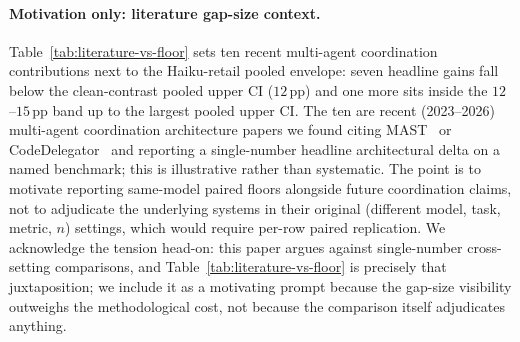 \paragraph{Motivation only: literature gap-size context.}
Table~\ref{tab:literature-vs-floor} sets ten recent multi-agent
coordination contributions next to the Haiku-retail pooled
envelope: seven headline gains fall below the clean-contrast
pooled upper CI ($12$\,pp) and one more sits inside the
$12$--$15$\,pp band up to the largest pooled upper CI. The ten are recent (2023--2026) multi-agent
coordination architecture papers we found citing
MAST~\cite{mast2025} or CodeDelegator~\cite{codedelegator2026}
and reporting a single-number headline architectural delta on a
named benchmark; this is illustrative rather than systematic.
The point is to motivate reporting same-model paired floors
alongside future coordination claims, not to adjudicate the
underlying systems in their original (different model, task,
metric, $n$) settings, which would require per-row paired
replication. We acknowledge the tension head-on: this paper
argues against single-number cross-setting comparisons, and
Table~\ref{tab:literature-vs-floor} is precisely that
juxtaposition; we include it as a motivating prompt because
the gap-size visibility outweighs the methodological cost,
not because the comparison itself adjudicates anything.

